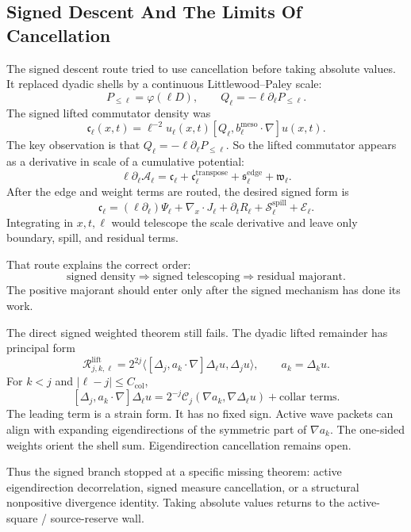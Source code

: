 \subsection{Signed Descent And The Limits Of Cancellation}

The signed descent route tried to use cancellation before taking absolute
values.
It replaced dyadic shells by a continuous Littlewood--Paley scale:
\[
  P_{\le \ell}=\varphi(\ell D),
  \qquad
  Q_\ell=-\ell\partial_\ell P_{\le \ell}.
\]
The signed lifted commutator density was
\[
  \mathfrak c_\ell(x,t)
  =
  \ell^{-2}
  u_\ell(x,t)
  [Q_\ell,b_\ell^{\mathrm{meso}}\cdot\nabla]u(x,t).
\]
The key observation is that \(Q_\ell=-\ell\partial_\ell P_{\le\ell}\).
So the lifted commutator appears as a derivative in scale of a cumulative
potential:
\[
  \ell\partial_\ell \mathcal A_\ell
  =
  \mathfrak c_\ell
  +\mathfrak c_\ell^{\mathrm{transpose}}
  +\mathfrak s_\ell^{\mathrm{edge}}
  +\mathfrak w_\ell .
\]
After the edge and weight terms are routed, the desired signed form is
\[
  \mathfrak c_\ell
  =
  (\ell\partial_\ell)\Psi_\ell
  +\nabla_x\cdot J_\ell
  +\partial_t R_\ell
  +\mathcal S_\ell^{\mathrm{spill}}
  +\mathcal E_\ell .
\]
Integrating in \(x,t,\ell\) would telescope the scale derivative and leave only
boundary, spill, and residual terms.

That route explains the correct order:
\[
  \text{signed density}
  \Longrightarrow
  \text{signed telescoping}
  \Longrightarrow
  \text{residual majorant}.
\]
The positive majorant should enter only after the signed mechanism has done its
work.

The direct signed weighted theorem still fails.
The dyadic lifted remainder has principal form
\[
  \mathcal R_{j,k,\ell}^{\mathrm{lift}}
  =
  2^{2j}
  \langle[\Delta_j,a_k\cdot\nabla]\Delta_\ell u,\Delta_j u\rangle,
  \qquad
  a_k=\Delta_k u .
\]
For \(k<j\) and \(|\ell-j|\le C_{\mathrm{col}}\),
\[
  [\Delta_j,a_k\cdot\nabla]\Delta_\ell u
  =
  2^{-j}\mathcal C_j(\nabla a_k,\nabla\Delta_\ell u)
  +\text{collar terms}.
\]
The leading term is a strain form.
It has no fixed sign.
Active wave packets can align with expanding eigendirections of the symmetric
part of \(\nabla a_k\).
The one-sided weights orient the shell sum.
Eigendirection cancellation remains open.

Thus the signed branch stopped at a specific missing theorem:
active eigendirection decorrelation, signed measure cancellation, or a
structural nonpositive divergence identity.
Taking absolute values returns to the active-square / source-reserve wall.

